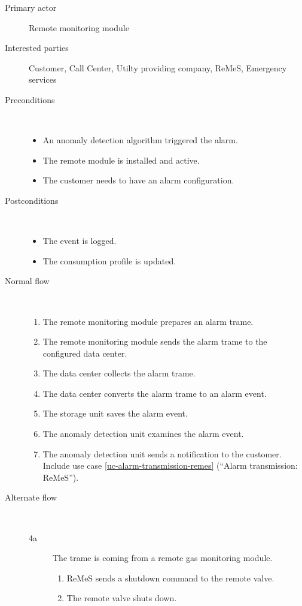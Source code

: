 \begin{description}
	\item[Primary actor] Remote monitoring module
	\item[Interested parties] Customer, Call Center, Utilty providing company,
	ReMeS, Emergency services
	\item[Preconditions] \ 
	\begin{itemize}
	  	\item An anomaly detection algorithm triggered the alarm.
		\item The remote module is installed and active.
		\item The customer needs to have an alarm configuration.
	\end{itemize}
	\item[Postconditions] \ 
	\begin{itemize}
		\item The event is logged.
		\item The consumption profile is updated.
	\end{itemize}
	\item[Normal flow] \ 
	\begin{enumerate}
	  	\item The remote monitoring module prepares an alarm trame.
	  	\item The remote monitoring module sends the alarm trame to the configured
	  	data center. 
	  	\item The data center collects the alarm trame.
		\item The data center converts the alarm trame to an alarm event.
		\item The storage unit saves the alarm event.
	  	\item The anomaly detection unit examines the alarm event.
	  	\item The anomaly detection unit sends a notification to the customer.
	  	Include use case \ref{uc-alarm-transmission-remes} (``Alarm transmission: ReMeS'').
	\end{enumerate}
	\item[Alternate flow] \ 
	\begin{description}
		\item[4a] The trame is coming from a remote gas monitoring module.
			\begin{enumerate}
				\item ReMeS sends a shutdown command to the remote valve.
				\item The remote valve shuts down.

\end{enumerate}
\end{description}
\end{description}
